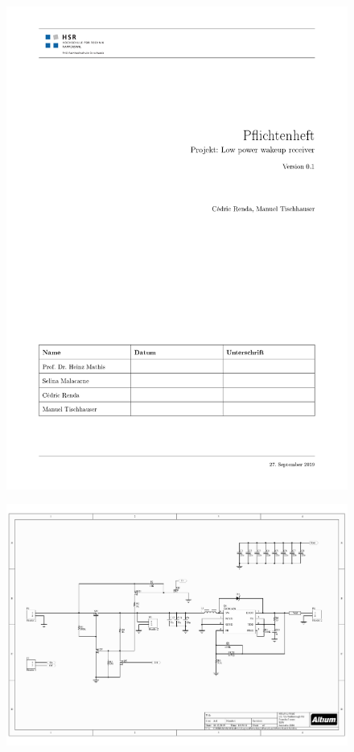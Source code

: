 \begin{landscape}
	\begin{figure}[H]
		\centering
		\includegraphics[trim= 0cm 0cm 0cm 0cm,page=5,width=22.56cm]{../Pflichtenheft/HSR_SRS_main.pdf}
	\end{figure}
\end{landscape}

\begin{landscape}
	\begin{figure}[H]
		\centering
		\includegraphics[trim= 0cm 0cm 0cm 0cm,width=22.56cm]{4-development/hardware/graphics/PowerLatch/PwrLatch_V1_sch.pdf}
	\end{figure}
\end{landscape}